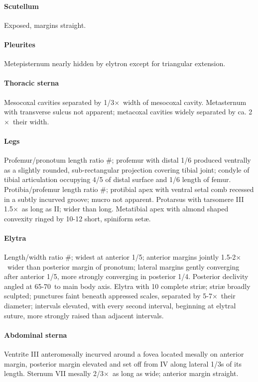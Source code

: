 \documentclass[fleqn,10pt,lineno]{wlpeerj} %
\newcommand{\td}{\textdegree~}
\newcommand{\x}{$\times$~}
\begin{document}
			\paragraph{Scutellum}
				Exposed, margins straight.
			\paragraph{Pleurites}
				Metepisternum nearly hidden by elytron except for triangular extension.
			\paragraph{Thoracic sterna} 
				Mesocoxal cavities separated by 1/3\x width of mesocoxal cavity. 
				Metasternum with transverse sulcus not apparent; metacoxal cavities widely separated by ca. 2\x their width.
			\paragraph{Legs}
				Profemur/pronotum length ratio \#; profemur with distal 1/6 produced ventrally as a slightly rounded, sub-rectangular projection covering tibial joint; condyle of tibial articulation occupying 4/5 of distal surface and 1/6 length of femur. 
				Protibia/profemur length ratio \#; protibial apex with ventral setal comb recessed in a subtly incurved groove; mucro not apparent. 
				Protarsus with tarsomere III 1.5\x as long as II; wider than long. 
				Metatibial apex with almond shaped convexity ringed by 10-12 short, spiniform set{\ae}.
			\paragraph{Elytra}
				Length/width ratio \#; widest at anterior 1/5; anterior margins jointly 1.5-2\x wider than posterior margin of pronotum; lateral margins gently converging after anterior 1/5, more strongly converging in posterior 1/4. 
				Posterior declivity angled at 65-70\td to main body axis. Elytra with 10 complete stri{\ae}; stri{\ae} broadly sculpted; punctures faint beneath appressed scales, separated by 5-7\x their diameter; intervals elevated, with every second interval, beginning at elytral suture, more strongly raised than adjacent intervals.
			\paragraph{Abdominal sterna}
				Ventrite III anteromesally incurved around a fovea located mesally on anterior margin, posterior margin elevated and set off from IV along lateral 1/3s of its length. 
				Sternum VII mesally 2/3\x as long as wide; anterior margin straight.
\end{document}
